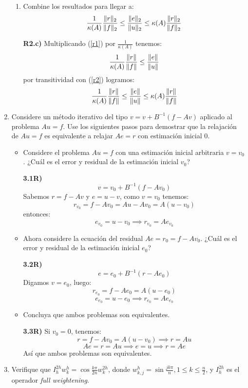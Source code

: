 \documentclass{article}
\DeclarePairedDelimiter{\norm}{\lVert}{\rVert}
\begin{document}
\begin{enumerate}
\begin{enumerate}
        \item Combine los resultados para llegar a:
        $$\frac{1}{\kappa(A)}\frac{\norm{r}_2}{\norm{f}_2} 
        \leq \frac{\norm{e}_2}{\norm{u}_2}
        \leq \kappa(A)\frac{\norm{r}_2}{\norm{f}_2}$$
        
        \textbf{R2.c)} Multiplicando (\ref{r1}) por $\frac{1}{\kappa(A)}$ tenemos:
        $$ \frac{1}{\kappa(A)}\frac{\norm{r}}{\norm{f}} \leq \frac{\norm{e}}{\norm{u}} $$
        por transitividad con (\ref{r2}) logramos:
        $$\frac{1}{\kappa(A)}\frac{\norm{r}}{\norm{f}} 
        \leq \frac{\norm{e}}{\norm{u}}
        \leq \kappa(A)\frac{\norm{r}}{\norm{f}}$$
    \end{enumerate}

    \item
    Considere un método iterativo del tipo $v = v + B^{-1}(f-Av)$ aplicado al problema $Au = f$. Use los siguientes pasos para demostrar que la relajación de $Au=f$ es equivalente a relajar $Ae=r$ con estimación inicial $0$.
    \begin{itemize}
        \item 
            Considere el problema $Au=f$ con una estimación inicial arbitraria $v = v_0$. ¿Cuál es el error y residual de la estimación inicial $v_0$?
            
            \textbf{3.1R)} 
            $$ v = v_0 + B^{-1}(f-Av_0)$$
            Sabemos $r=f-Av$ y $e = u-v$, como $v=v_0$ tenemos:
            $$r_{v_0} = f - Av_0 = Au - Av_0 = A(u-v_0)$$ 
            entonces: $$e_{v_0} = u-v_0 \implies r_{v_0} = Ae_{v_0}$$
        \item 
            Ahora considere la ecuación del residual $Ae=r_0=f-Av_0$.
            ¿Cuál es el error y residual de la estimación inicial $e_0$?
            
            \textbf{3.2R)}
            $$ e = e_0 + B^{-1}(r-Ae_0)$$
            Digamos $v = e_0$, luego:
            $$ r_{e_0} = f - Ae_0 = A(u - e_0)$$
            $$ e_{e_0} = u - e_0 \implies r_{e_0} = Ae_{e_0}$$
        \item Concluya que ambos problemas son equivalentes.
        
            \textbf{3.3R)} Si $v_0 = 0$, tenemos:
            $$r = f - Av_0 = A(u - v_0) \implies r = Au$$
            $$Ae = r = Au \implies e = u \implies r=Ae$$
            Así que ambos problemas son equivalentes. 
    \end{itemize}

    \item 
    Verifique que $I^{2h}_{h}w^h_k=\cos{\frac{k\pi}{2n}}w^{2h}_k$, donde $ w^h_{k,j}=\sin{\frac{jk\pi}{n}}, 1\leq k\leq \frac{n}{2}$, y $I^{2h}_h$ es el operador \emph{full weightening}.
    

\end{enumerate}
\end{document}
